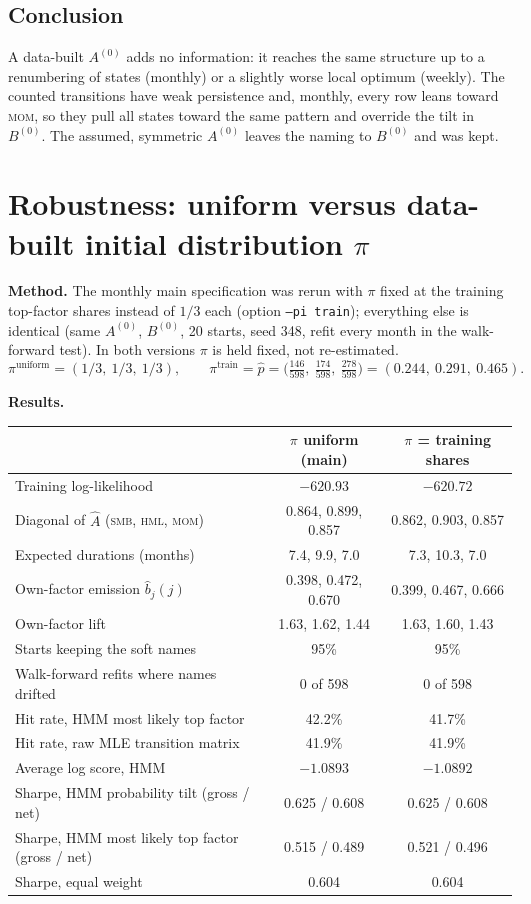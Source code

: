 \documentclass[11pt]{article}
\newcommand{\SMB}{\textsc{smb}}
\newcommand{\HML}{\textsc{hml}}
\newcommand{\MOM}{\textsc{mom}}
\begin{document}
\subsection{Conclusion}
A data-built $A^{(0)}$ adds no information: it reaches the same structure up to a renumbering of states (monthly) or a slightly worse local optimum (weekly). The counted transitions have weak persistence and, monthly, every row leans toward \MOM, so they pull all states toward the same pattern and override the tilt in $B^{(0)}$. The assumed, symmetric $A^{(0)}$ leaves the naming to $B^{(0)}$ and was kept.

\section{Robustness: uniform versus data-built initial distribution $\pi$}\label{sec:pirobust}

\textbf{Method.} The monthly main specification was rerun with $\pi$ fixed at the training top-factor shares instead of $1/3$ each (option \texttt{--pi train}); everything else is identical (same $A^{(0)}$, $B^{(0)}$, 20 starts, seed 348, refit every month in the walk-forward test). In both versions $\pi$ is held fixed, not re-estimated.
\[
\pi^{\text{uniform}}=(1/3,\ 1/3,\ 1/3),\qquad
\pi^{\text{train}}=\hat p=\Big(\tfrac{146}{598},\ \tfrac{174}{598},\ \tfrac{278}{598}\Big)=(0.244,\ 0.291,\ 0.465).
\]

\textbf{Results.}
\begin{center}
\begin{tabular}{lcc}
\toprule
 & $\pi$ uniform (main) & $\pi$ = training shares \\
\midrule
Training log-likelihood & $-620.93$ & $-620.72$ \\
Diagonal of $\hat A$ (\SMB, \HML, \MOM) & 0.864, 0.899, 0.857 & 0.862, 0.903, 0.857 \\
Expected durations (months) & 7.4, 9.9, 7.0 & 7.3, 10.3, 7.0 \\
Own-factor emission $\hat b_j(j)$ & 0.398, 0.472, 0.670 & 0.399, 0.467, 0.666 \\
Own-factor lift & 1.63, 1.62, 1.44 & 1.63, 1.60, 1.43 \\
Starts keeping the soft names & 95\% & 95\% \\
Walk-forward refits where names drifted & 0 of 598 & 0 of 598 \\
\midrule
Hit rate, HMM most likely top factor & 42.2\% & 41.7\% \\
Hit rate, raw MLE transition matrix & 41.9\% & 41.9\% \\
Average log score, HMM & $-1.0893$ & $-1.0892$ \\
\midrule
Sharpe, HMM probability tilt (gross / net) & 0.625 / 0.608 & 0.625 / 0.608 \\
Sharpe, HMM most likely top factor (gross / net) & 0.515 / 0.489 & 0.521 / 0.496 \\
Sharpe, equal weight & 0.604 & 0.604 \\
\bottomrule
\end{tabular}
\end{center}
\end{document}
